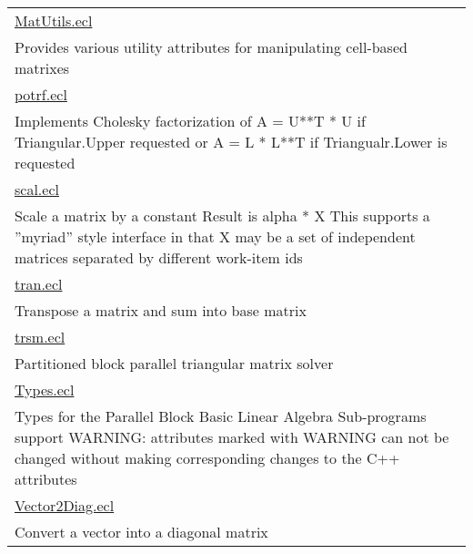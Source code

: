 {\begin{longtable}{|p{\textwidth}|}
\hline
\hyperlink{ecldoc:toc:PBblas.MatUtils}{MatUtils.ecl} \\
Provides various utility attributes for manipulating cell-based matrixes \\
\hline
\hyperlink{ecldoc:toc:PBblas.potrf}{potrf.ecl} \\
Implements Cholesky factorization of A = U**T * U if Triangular.Upper requested or A = L * L**T if Triangualr.Lower is requested \\
\hline
\hyperlink{ecldoc:toc:PBblas.scal}{scal.ecl} \\
Scale a matrix by a constant Result is alpha * X This supports a ''myriad'' style interface in that X may be a set of independent matrices separated by different work-item ids \\
\hline
\hyperlink{ecldoc:toc:PBblas.tran}{tran.ecl} \\
Transpose a matrix and sum into base matrix \\
\hline
\hyperlink{ecldoc:toc:PBblas.trsm}{trsm.ecl} \\
Partitioned block parallel triangular matrix solver \\
\hline
\hyperlink{ecldoc:toc:PBblas.Types}{Types.ecl} \\
Types for the Parallel Block Basic Linear Algebra Sub-programs support WARNING: attributes marked with WARNING can not be changed without making corresponding changes to the C++ attributes \\
\hline
\hyperlink{ecldoc:toc:PBblas.Vector2Diag}{Vector2Diag.ecl} \\
Convert a vector into a diagonal matrix \\
\hline
\end{longtable}
}



















